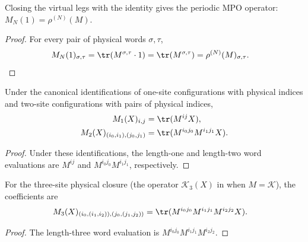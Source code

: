 \begin{lemma}
    \label{lem:phys_close_identity}
    \leanok
    Closing the virtual legs with the identity gives the periodic MPO
    operator: $M_N(1)=\rho^{(N)}(M)$.
\end{lemma}

\begin{proof}
    \leanok
    For every pair of physical words $\sigma,\tau$,
    \begin{align}
        M_N(1)_{\sigma,\tau}
         & =\tr\!\left(M^{\sigma,\tau}\cdot1\right)
        =\tr\!\left(M^{\sigma,\tau}\right)
        =\rho^{(N)}(M)_{\sigma,\tau}.
        \notag
    \end{align}
\end{proof}

\begin{lemma}
    \label{thm:phys_close_one_two}
    \leanok
    Under the canonical identifications of one-site configurations with
    physical indices and two-site configurations with pairs of physical
    indices,
    \begin{align}
        M_1(X)_{i,j}
         & =\tr(M^{ij}X),
        \notag                          \\
        M_2(X)_{(i_0,i_1),(j_0,j_1)}
         & =\tr(M^{i_0j_0}M^{i_1j_1}X).
        \notag
    \end{align}
\end{lemma}
\begin{proof}
    \leanok
    Under these identifications, the length-one and length-two word
    evaluations are $M^{ij}$ and $M^{i_0j_0}M^{i_1j_1}$, respectively.
\end{proof}

\begin{lemma}
    \label{lem:phys_close_three}
    \leanok
    For the three-site physical closure (the operator $\mathcal K_3(X)$ in
    \cite[Proposition~C.7, lines~1510--1516]{Cirac2016MPDO_arXiv} when
    $M=\mathcal K$), the coefficients are
    \begin{align}
        M_3(X)_{(i_0,(i_1,i_2)),(j_0,(j_1,j_2))}
         & =\tr(M^{i_0j_0}M^{i_1j_1}M^{i_2j_2}X).
        \notag
    \end{align}
\end{lemma}
\begin{proof}
    \leanok
    The length-three word evaluation is
    $M^{i_0j_0}M^{i_1j_1}M^{i_2j_2}$.
\end{proof}

